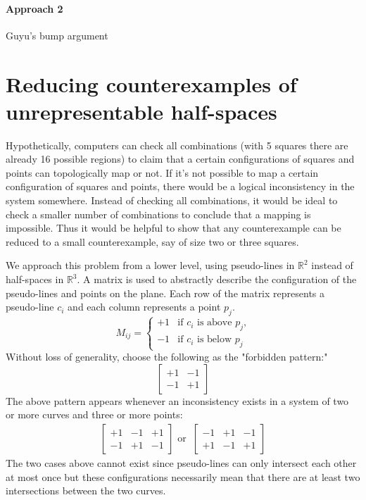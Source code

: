 \documentclass{NSF}
\begin{document}
\paragraph{Approach 2} Guyu's bump argument



\section{Reducing counterexamples of unrepresentable half-spaces}
Hypothetically, computers can check all combinations (with 5 squares there are already 16 possible regions) to claim that a certain configurations of squares and points can topologically map or not. If it's not possible to map a certain configuration of squares and points, there would be a logical inconsistency in the system somewhere. Instead of checking all combinations, it would be ideal to check a smaller number of combinations  to conclude that a mapping is impossible. Thus it would be helpful to show that any counterexample can be reduced to a small counterexample, say of size two or three squares.

We approach this problem from a lower level, using pseudo-lines in $\mathbb{R}^2$ instead of half-spaces in $\mathbb{R}^3$. A matrix is used to abstractly describe the configuration of the pseudo-lines and points on the plane. Each row of the matrix represents a pseudo-line $c_i$ and each column represents a point $p_j$. 
\begin{equation*}
M_{ij} =\begin{cases}
            	+1 & \text{if $c_i$ is above $p_j$,} \\
                -1 & \text{if $c_i$ is below $p_j$}
            \end{cases}
\end{equation*}
Without loss of generality, choose the following as the "forbidden pattern:" 
\begin{equation}
\begin{bmatrix}
    +1 & -1 \\
    -1 & +1 
\end{bmatrix}
\end{equation}
The above pattern appears whenever an inconsistency exists in a system of two or more curves and three or more points:
\begin{align*}
\begin{bmatrix}
    +1 & -1 & +1 \\
    -1 & +1 & -1
\end{bmatrix} \text{ or }\ 
\begin{bmatrix}
    -1 & +1 & -1  \\
    +1 & -1 & +1
\end{bmatrix}
\end{align*}
The two cases above cannot exist since pseudo-lines can only intersect each other at most once but these configurations necessarily mean that there are at least two intersections between the two curves. 
\end{document}
